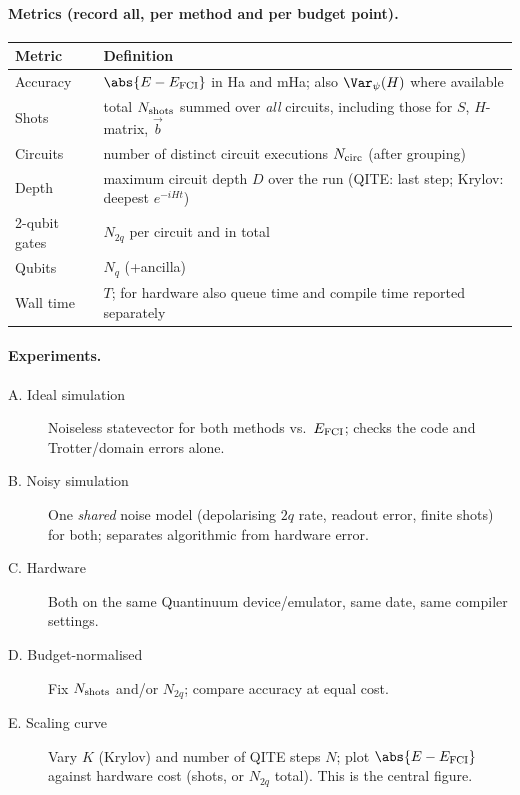 \documentclass[11pt,a4paper]{article}
\begin{document}
\paragraph{Metrics (record all, per method and per budget point).}
\begin{center}
\small\begin{tabular}{@{}p{2.6cm}p{12.6cm}@{}}
\toprule
Metric & Definition\\
\midrule
Accuracy & $\abs{E-E_{\rm FCI}}$ in Ha and mHa; also $\Var_\psi(H)$ where available\\
Shots & total $N_{\rm shots}$ summed over \emph{all} circuits, including those for $S$, $H$-matrix, $\vec b$\\
Circuits & number of distinct circuit executions $N_{\rm circ}$ (after grouping)\\
Depth & maximum circuit depth $D$ over the run (QITE: last step; Krylov: deepest $e^{-iHt}$)\\
2-qubit gates & $N_{2q}$ per circuit and in total\\
Qubits & $N_q$ (+ancilla)\\
Wall time & $T$; for hardware also queue time and compile time reported separately\\
\bottomrule
\end{tabular}
\end{center}

\paragraph{Experiments.}
\begin{description}
\item[A. Ideal simulation] Noiseless statevector for both methods vs.\ $E_{\rm FCI}$; checks the code and
Trotter/domain errors alone.
\item[B. Noisy simulation] One \emph{shared} noise model (depolarising $2q$ rate, readout error,
finite shots) for both; separates algorithmic from hardware error.
\item[C. Hardware] Both on the same Quantinuum device/emulator, same date, same compiler settings.
\item[D. Budget-normalised] Fix $N_{\rm shots}$ and/or $N_{2q}$; compare accuracy at equal cost.
\item[E. Scaling curve] Vary $K$ (Krylov) and number of QITE steps $N$; plot
$\abs{E-E_{\rm FCI}}$ against hardware cost (shots, or $N_{2q}$ total). This is the central figure.
\end{description}
\end{document}
